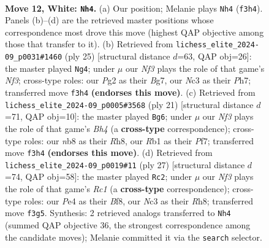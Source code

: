 \documentclass[11pt]{article}
\begin{document}
\begin{figure}[p]
\label{fig:thought-m20}
\end{figure}

\clearpage

\begin{figure}[p]\centering
\begin{subfigure}{0.46\textwidth}\centering
\resizebox{\linewidth}{!}{%
\newchessgame
\chessboard[
  setfen={rn3rk1/ppp3bp/5pp1/4p3/2P1P1b1/2N2N2/PP3PP1/1RBBK2R w K - 0 12},
  showmover=false,
  pgfstyle=straightmove, color=movearrow, markmove={f3-h4}
]}
\caption{}
\end{subfigure}\hfill
\begin{subfigure}{0.46\textwidth}\centering
\resizebox{\linewidth}{!}{%
\newchessgame
\chessboard[
  setfen={r1b1r1k1/pp3pbp/2p2np1/4B3/2P2P2/1P4P1/P3P1BP/RN1R2K1 b - - 0 13},
  showmover=false,
  pgfstyle=straightmove, color=movearrow, markmove={f6-g4}
]}
\caption{}
\end{subfigure}
\\[4pt]
\begin{subfigure}{0.46\textwidth}\centering
\resizebox{\linewidth}{!}{%
\newchessgame
\chessboard[
  setfen={2kr1b1r/pp2pp1p/2n2n2/2P3Nb/1P6/2P5/P3BPPP/RNB1K2R b - - 0 11},
  showmover=false,
  pgfstyle=straightmove, color=movearrow, markmove={h5-g6}
]}
\caption{}
\end{subfigure}\hfill
\begin{subfigure}{0.46\textwidth}\centering
\resizebox{\linewidth}{!}{%
\newchessgame
\chessboard[
  setfen={2r1kb1r/Np1n1pp1/5n1p/3pp3/8/1P1P2PP/1P2bPB1/RNB1R1K1 b k - 0 14},
  showmover=false,
  pgfstyle=straightmove, color=movearrow, markmove={c8-c2}
]}
\caption{}
\end{subfigure}
\caption{\textbf{Move 12, White: \texttt{Nh4}.} (a) Our position; Melanie plays \texttt{Nh4} (\texttt{f3h4}). Panels (b)--(d) are the retrieved master positions whose correspondence most drove this move (highest QAP objective among those that transfer to it). (b) Retrieved from \texttt{lichess\_elite\_2024-09\_p0031\#1460} (ply 25) [structural distance $d$=63, QAP obj=26]: the master played \texttt{Ng4}; under $\mu$ our \emph{Nf3} plays the role of that game's \emph{Nf3}; cross-type roles: our \emph{P}g2 as their \emph{B}g7, our \emph{N}c3 as their \emph{P}h7; transferred move \texttt{f3h4} \textbf{(endorses this move)}. (c) Retrieved from \texttt{lichess\_elite\_2024-09\_p0005\#3568} (ply 21) [structural distance $d$=71, QAP obj=10]: the master played \texttt{Bg6}; under $\mu$ our \emph{Nf3} plays the role of that game's \emph{Bh4} (a \textbf{cross-type} correspondence); cross-type roles: our \emph{n}b8 as their \emph{R}h8, our \emph{R}b1 as their \emph{P}f7; transferred move \texttt{f3h4} \textbf{(endorses this move)}. (d) Retrieved from \texttt{lichess\_elite\_2024-09\_p0019\#11} (ply 27) [structural distance $d$=74, QAP obj=58]: the master played \texttt{Rc2}; under $\mu$ our \emph{Nf3} plays the role of that game's \emph{Rc1} (a \textbf{cross-type} correspondence); cross-type roles: our \emph{P}e4 as their \emph{B}f8, our \emph{N}c3 as their \emph{R}h8; transferred move \texttt{f3g5}. Synthesis: 2 retrieved analogs transferred to \texttt{Nh4} (summed QAP objective 36, the strongest correspondence among the candidate moves); Melanie committed it via the \texttt{search} selector.}

\end{figure}
\end{document}
